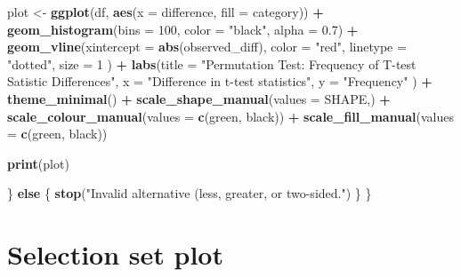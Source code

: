 \documentclass[
]{book}
\newenvironment{Shaded}{\begin{snugshade}}{\end{snugshade}}
\newcommand{\AttributeTok}[1]{\textcolor[rgb]{0.13,0.29,0.53}{#1}}
\newcommand{\ControlFlowTok}[1]{\textcolor[rgb]{0.13,0.29,0.53}{\textbf{#1}}}
\newcommand{\DecValTok}[1]{\textcolor[rgb]{0.00,0.00,0.81}{#1}}
\newcommand{\FloatTok}[1]{\textcolor[rgb]{0.00,0.00,0.81}{#1}}
\newcommand{\FunctionTok}[1]{\textcolor[rgb]{0.13,0.29,0.53}{\textbf{#1}}}
\newcommand{\NormalTok}[1]{#1}
\newcommand{\OtherTok}[1]{\textcolor[rgb]{0.56,0.35,0.01}{#1}}
\newcommand{\SpecialCharTok}[1]{\textcolor[rgb]{0.81,0.36,0.00}{\textbf{#1}}}
\newcommand{\StringTok}[1]{\textcolor[rgb]{0.31,0.60,0.02}{#1}}
\begin{document}
\begin{Shaded}
\begin{Highlighting}[]
\NormalTok{    plot }\OtherTok{\textless{}{-}} \FunctionTok{ggplot}\NormalTok{(df, }\FunctionTok{aes}\NormalTok{(}\AttributeTok{x =}\NormalTok{ difference, }\AttributeTok{fill =}\NormalTok{ category)) }\SpecialCharTok{+}
        \FunctionTok{geom\_histogram}\NormalTok{(}\AttributeTok{bins =} \DecValTok{100}\NormalTok{,}
                        \AttributeTok{color =} \StringTok{"black"}\NormalTok{,}
                        \AttributeTok{alpha =} \FloatTok{0.7}\NormalTok{) }\SpecialCharTok{+}
        \FunctionTok{geom\_vline}\NormalTok{(}\AttributeTok{xintercept =} \FunctionTok{abs}\NormalTok{(observed\_diff),}
                    \AttributeTok{color =} \StringTok{"red"}\NormalTok{,}
                    \AttributeTok{linetype =} \StringTok{"dotted"}\NormalTok{,}
                    \AttributeTok{size =} \DecValTok{1}
\NormalTok{                    ) }\SpecialCharTok{+}
        \FunctionTok{labs}\NormalTok{(}\AttributeTok{title =} \StringTok{"Permutation Test: Frequency of T{-}test Satistic Differences"}\NormalTok{,}
                \AttributeTok{x =} \StringTok{"Difference in t{-}test statistics"}\NormalTok{,}
                \AttributeTok{y =} \StringTok{"Frequency"}
\NormalTok{                ) }\SpecialCharTok{+}
        \FunctionTok{theme\_minimal}\NormalTok{() }\SpecialCharTok{+}
        \FunctionTok{scale\_shape\_manual}\NormalTok{(}\AttributeTok{values =}\NormalTok{ SHAPE,) }\SpecialCharTok{+}
        \FunctionTok{scale\_colour\_manual}\NormalTok{(}\AttributeTok{values =} \FunctionTok{c}\NormalTok{(}\StringTok{\textquotesingle{}green\textquotesingle{}}\NormalTok{, }\StringTok{\textquotesingle{}black\textquotesingle{}}\NormalTok{)) }\SpecialCharTok{+}
        \FunctionTok{scale\_fill\_manual}\NormalTok{(}\AttributeTok{values =} \FunctionTok{c}\NormalTok{(}\StringTok{\textquotesingle{}green\textquotesingle{}}\NormalTok{, }\StringTok{\textquotesingle{}black\textquotesingle{}}\NormalTok{))}

  \FunctionTok{print}\NormalTok{(plot)}

\NormalTok{  \} }\ControlFlowTok{else}\NormalTok{ \{}
    \FunctionTok{stop}\NormalTok{(}\StringTok{"Invalid alternative (less, greater, or two{-}sided."}\NormalTok{)}
\NormalTok{  \}}
\NormalTok{\}}
\end{Highlighting}
\end{Shaded}

\hypertarget{selection-set-plot}{%
\section{Selection set plot}\label{selection-set-plot}}
\end{document}
